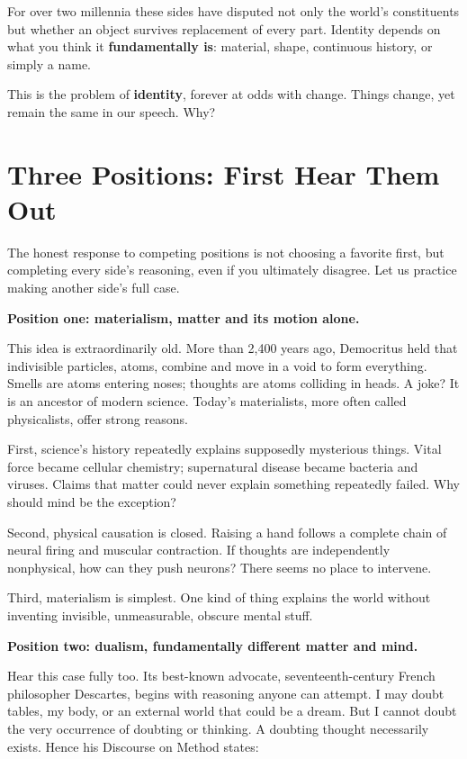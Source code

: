 For over two millennia these sides have disputed not only the world's constituents but whether an object survives replacement of every part. Identity depends on what you think it \textbf{fundamentally is}: material, shape, continuous history, or simply a name.

This is the problem of \textbf{identity}, forever at odds with change. Things change, yet remain the same in our speech. Why?

\section{Three Positions: First Hear Them Out}
The honest response to competing positions is not choosing a favorite first, but completing every side's reasoning, even if you ultimately disagree. Let us practice making another side's full case.

\textbf{Position one: materialism, matter and its motion alone.}

This idea is extraordinarily old. More than 2,400 years ago, Democritus held that indivisible particles, atoms, combine and move in a void to form everything. Smells are atoms entering noses; thoughts are atoms colliding in heads. A joke? It is an ancestor of modern science. Today's materialists, more often called physicalists, offer strong reasons.

First, science's history repeatedly explains supposedly mysterious things. Vital force became cellular chemistry; supernatural disease became bacteria and viruses. Claims that matter could never explain something repeatedly failed. Why should mind be the exception?

Second, physical causation is closed. Raising a hand follows a complete chain of neural firing and muscular contraction. If thoughts are independently nonphysical, how can they push neurons? There seems no place to intervene.

Third, materialism is simplest. One kind of thing explains the world without inventing invisible, unmeasurable, obscure mental stuff.

\textbf{Position two: dualism, fundamentally different matter and mind.}

Hear this case fully too. Its best-known advocate, seventeenth-century French philosopher Descartes, begins with reasoning anyone can attempt. I may doubt tables, my body, or an external world that could be a dream. But I cannot doubt the very occurrence of doubting or thinking. A doubting thought necessarily exists. Hence his Discourse on Method states:

